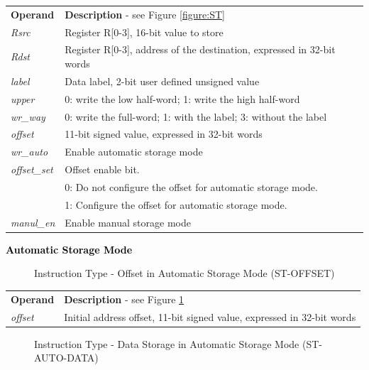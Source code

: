 \documentclass[main\_\_EN.tex]{subfiles}
\begin{document}
\begin{tabular}{ l l }
\textbf{Operand} & \textbf{Description} - see Figure \ref{figure:ST} \\
\textit{Rsrc} & Register R[0-3], 16-bit value to store\\
\textit{Rdst} & Register R[0-3], address of the destination, expressed in 32-bit words\\
\textit{label} & Data label, 2-bit user defined unsigned value\\
\textit{upper} & 0: write the low half-word; 1: write the high half-word\\
\textit{wr\_way} & 0: write the full-word; 1: with the label; 3: without the label\\
\textit{offset} & 11-bit signed value, expressed in 32-bit words\\
\textit{wr\_auto} & Enable automatic storage mode \\
\textit{offset\_set} & Offset enable bit. \\
   & 0: Do not configure the offset for automatic storage mode. \\
   & 1: Configure the offset for automatic storage mode. \\
\textit{manul\_en} & Enable manual storage mode

\end{tabular}

\textcolor{black}{\bfseries Automatic Storage Mode}

%
%
%
%
%
\begin{figure}[!ht ]
    \centering
    \caption{Instruction Type - Offset in Automatic Storage Mode (ST-OFFSET)}
    \label{figure:ST-AUTO-OFFSET}
\end{figure}

\begin{tabular}{ l l }
\textbf{Operand} & \textbf{Description} - see Figure \ref{figure:ST-AUTO-OFFSET} \\
\textit{offset} & Initial address offset, 11-bit signed value, expressed in 32-bit words\\
\end{tabular}

%
%
%
%
%
%
%
%
\begin{figure}[!ht ]
    \centering
    \caption{Instruction Type - Data Storage in Automatic Storage Mode (ST-AUTO-DATA)}
    \label{figure:ST-AUTO-DATA}
\end{figure}
\end{document}
